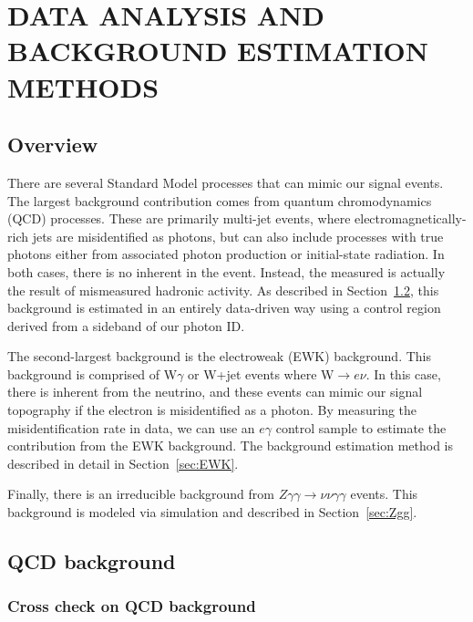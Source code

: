 \chapter{DATA ANALYSIS AND BACKGROUND ESTIMATION METHODS}
\label{chap:DataAnalysis}

\section{Overview}

There are several Standard Model processes that can mimic our signal events. The largest background contribution comes from quantum chromodynamics (QCD) processes. These are primarily multi-jet events, where electromagnetically-rich jets are misidentified as photons, but can also include processes with true photons either from associated photon production or initial-state radiation. In both cases, there is no inherent \ETmiss in the event. Instead, the measured \ETmiss is actually the result of mismeasured hadronic activity. As described in Section~\ref{sec:QCD}, this background is estimated in an entirely data-driven way using a control region derived from a sideband of our photon ID. 

The second-largest background is the electroweak (EWK) background. This background is comprised of W$\gamma$ or W+jet events where W$\rightarrow e \nu$. In this case, there is inherent \ETmiss from the neutrino, and these events can mimic our signal topography if the electron is misidentified as a photon. By measuring the misidentification rate in data, we can use an $e\gamma$ control sample to estimate the contribution from the EWK background. The background estimation method is described in detail in Section~\ref{sec:EWK}. 

Finally, there is an irreducible background from $Z\gamma\gamma\rightarrow\nu\nu\gamma\gamma$ events. This background is modeled via simulation and described in Section~\ref{sec:Zgg}.


\section{QCD background}
\label{sec:QCD}

\subsection{Cross check on QCD background}
\label{sec:crossCheck}

